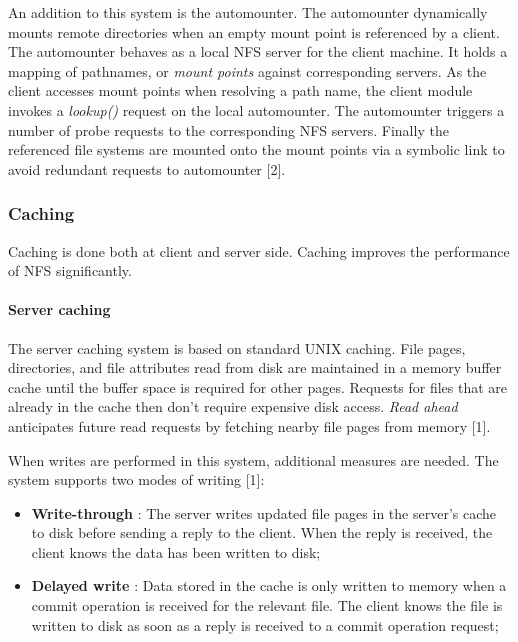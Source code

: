 An addition to this system is the automounter. The automounter dynamically mounts remote directories when an empty mount point is referenced by a client. The automounter behaves as a local NFS server for the client machine. It holds a mapping of pathnames, or \emph{mount points} against corresponding servers. As the client accesses mount points when resolving a path name, the client module invokes a \textit{lookup()} request on the local automounter. The automounter triggers a number of probe requests to the corresponding NFS servers. Finally the referenced file systems are mounted onto the mount points via a symbolic link to avoid redundant requests to automounter [2].


\subsubsection{Caching}

Caching is done both at client and server side. Caching improves the performance of NFS significantly.

\paragraph{Server caching}

The server caching system is based on standard UNIX caching. File pages, directories, and file attributes read from disk are maintained in a memory buffer cache until the buffer space is required for other pages. Requests for files that are already in the cache then don't require expensive disk access. \emph{Read ahead} anticipates future read requests by fetching nearby file pages from memory [1].

When writes are performed in this system, additional measures are needed. The system supports two modes of writing [1]:
\begin{itemize}
	\item \textbf{Write-through} : The server writes updated file pages in the server's cache to disk before sending a reply to the client. When the reply is received, the client knows the data has been written to disk;
	\item \textbf{Delayed write} : Data stored in the cache is only written to memory when a commit operation is received for the relevant file. The client knows the file is written to disk as soon as a reply is received to a commit operation request;
\end{itemize}



